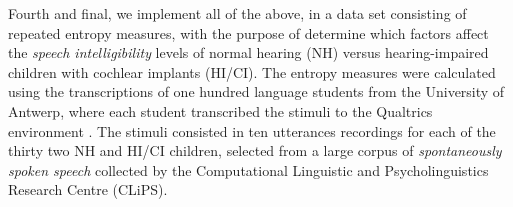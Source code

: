 Fourth and final, we implement all of the above, in a data set consisting of repeated entropy measures, with the purpose of determine which factors affect the \textit{speech intelligibility} levels of normal hearing (NH) versus hearing-impaired children with cochlear implants (HI/CI). The entropy measures were calculated using the transcriptions of one hundred language students from the University of Antwerp, where each student transcribed the stimuli to the Qualtrics environment \cite{Qualtrics_2005}. The stimuli consisted in ten utterances recordings for each of the thirty two NH and HI/CI children, selected from a large corpus of \textit{spontaneously spoken speech} collected by the Computational Linguistic and Psycholinguistics Research Centre (CLiPS).
%
%
